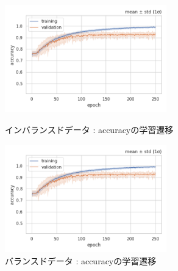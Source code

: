 \documentclass[a4j, 11pt]{jreport}
\begin{document}
\begin{figure}[htbp]
  \begin{minipage}[b]{0.45\hsize}
    \centering
    \includegraphics[keepaspectratio, width=7cm]{images/accs_ex4-2.png}
    \caption{インバランスドデータ : accuracyの学習遷移}
		\label{fig:accs_ex4-2-2}
  \end{minipage}
  \begin{minipage}[b]{0.45\hsize}
    \centering
    \includegraphics[keepaspectratio, width=7cm]{images/accs_ex4-2.png}
    \caption{バランスドデータ : accuracyの学習遷移}
		\label{fig:accs_ex4-3}
  \end{minipage}
\end{figure}

\newpage
\end{document}
